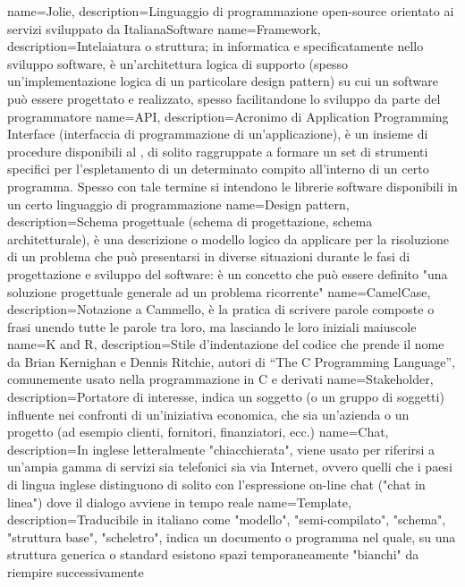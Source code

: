  {
	name=Jolie,
	description={Linguaggio di programmazione open-source orientato ai servizi sviluppato da
	ItalianaSoftware}
}
 {
	name=Framework,
	description={Intelaiatura o struttura; in informatica e specificatamente nello sviluppo software,
	è un'architettura logica di supporto (spesso un'implementazione logica di un particolare design
	pattern) su cui un software può essere progettato e realizzato, spesso facilitandone lo sviluppo
	da parte del programmatore}
}
 {
	name=API,
	description={Acronimo di Application Programming Interface (interfaccia di programmazione di
	un'applicazione), è un insieme di procedure disponibili al \programmatore, di solito
	raggruppate a formare un set di strumenti specifici per l'espletamento di un determinato
	compito all'interno di un certo programma. Spesso con tale termine si intendono le librerie
	software disponibili in un certo linguaggio di programmazione}
}
 {
	name=Design pattern,
	description={Schema progettuale (schema di progettazione, schema architetturale), è una
	descrizione o modello logico da applicare per la risoluzione di un problema che può presentarsi
	in diverse situazioni durante le fasi di progettazione e sviluppo del software: è un concetto
	che può essere definito "una soluzione progettuale generale ad un problema ricorrente"}
}
 {
	name=CamelCase,
	description={Notazione a Cammello, è la pratica di scrivere parole composte o frasi unendo tutte
	le parole tra loro, ma lasciando le loro iniziali maiuscole}
}
 {
	name=K and R,
	description={Stile d'indentazione del codice che prende il nome da Brian Kernighan e Dennis
	Ritchie, autori di ``The C Programming Language'', comunemente usato nella programmazione in
	C e derivati}
}
 {
	name=Stakeholder,
	description={Portatore di interesse, indica un soggetto (o un gruppo di soggetti) influente nei
	confronti di un'iniziativa economica, che sia un'azienda o un progetto (ad esempio clienti,
	fornitori, finanziatori, ecc.)}
}
 {
	name=Chat,
	description={In inglese letteralmente "chiacchierata", viene usato per riferirsi a un'ampia gamma
	di servizi sia telefonici sia via Internet, ovvero quelli che i paesi di lingua inglese
	distinguono di solito con l'espressione on-line chat ("chat in linea") dove il dialogo avviene
	in tempo reale}
}
 {
	name=Template,
	description={Traducibile in italiano come "modello", "semi-compilato", "schema", "struttura
	base", "scheletro", indica un documento o programma nel quale, su una struttura
	generica o standard esistono spazi temporaneamente "bianchi" da riempire successivamente}
}
